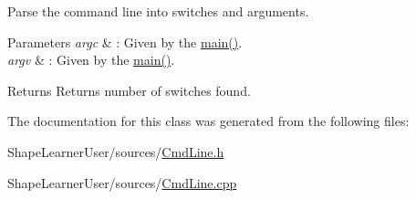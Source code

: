 Parse the command line into switches and arguments. 


\begin{DoxyParams}{Parameters}
{\em argc} & \+: Given by the \hyperlink{main_8cpp_a3c04138a5bfe5d72780bb7e82a18e627}{main()}. \\
\hline
{\em argv} & \+: Given by the \hyperlink{main_8cpp_a3c04138a5bfe5d72780bb7e82a18e627}{main()}. \\
\hline
\end{DoxyParams}
\begin{DoxyReturn}{Returns}
Returns number of switches found. 
\end{DoxyReturn}


The documentation for this class was generated from the following files\+:\begin{DoxyCompactItemize}
\item 
Shape\+Learner\+User/sources/\hyperlink{_cmd_line_8h}{Cmd\+Line.\+h}\item 
Shape\+Learner\+User/sources/\hyperlink{_cmd_line_8cpp}{Cmd\+Line.\+cpp}\end{DoxyCompactItemize}
